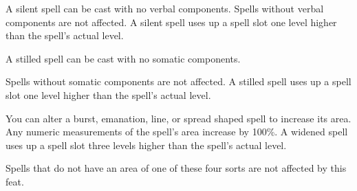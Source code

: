 {A silent spell can be cast with no verbal components. Spells without verbal components are not affected. A silent spell uses up a spell slot one level higher than the spell's actual level.}

{A stilled spell can be cast with no somatic components.

Spells without somatic components are not affected. A stilled spell uses up a spell slot one level higher than the spell's actual level.}

{You can alter a burst, emanation, line, or spread shaped spell to increase its area. Any numeric measurements of the spell's area increase by 100\%. A widened spell uses up a spell slot three levels higher than the spell's actual level.

Spells that do not have an area of one of these four sorts are not affected by this feat.}
